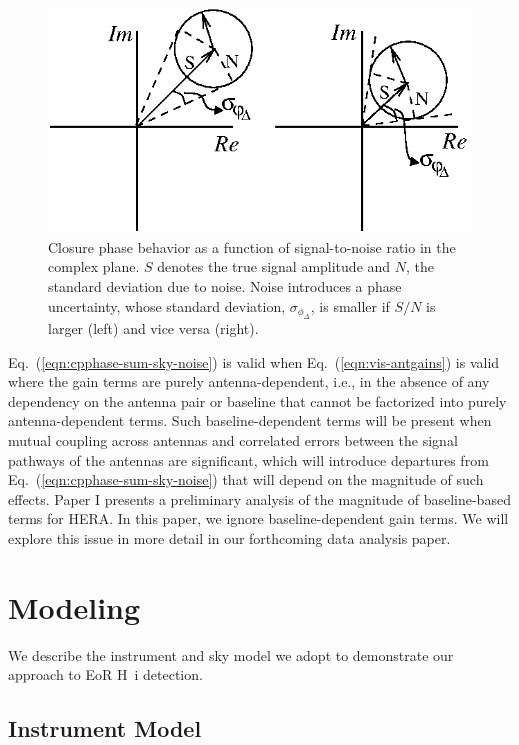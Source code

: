 \documentclass[
reprint,
superscriptaddress,
amsmath,
amssymb,
aps,
prd
]{revtex4-1}
\begin{document}
\begin{figure}[htb]
\includegraphics{phasor}
\caption{Closure phase behavior as a function of signal-to-noise ratio in the complex plane. $S$ denotes the true signal amplitude and $N$, the standard deviation due to noise. Noise introduces a phase uncertainty, whose standard deviation, $\sigma_{\phi_\Delta}$, is smaller if $S/N$ is larger (left) and vice versa (right). \label{fig:cpphase-cartoon}}
\end{figure}

Eq.~(\ref{eqn:cpphase-sum-sky-noise}) is valid when Eq.~(\ref{eqn:vis-antgains}) is valid where the gain terms are purely antenna-dependent, i.e., in the absence of any dependency on the antenna pair or baseline that cannot be factorized into purely antenna-dependent terms. Such baseline-dependent terms will be present when mutual coupling across antennas and correlated errors between the signal pathways of the antennas are significant, which will introduce departures from Eq.~(\ref{eqn:cpphase-sum-sky-noise}) that will depend on the magnitude of such effects. Paper I presents a preliminary analysis of the magnitude of baseline-based terms for HERA. In this paper, we ignore baseline-dependent gain terms. We will explore this issue in more detail in our forthcoming data analysis paper. 

\section{Modeling}\label{sec:modeling}

We describe the instrument and sky model we adopt to demonstrate our approach to EoR H~{\sc i} detection. 

\subsection{Instrument Model}\label{sec:instrument}
\end{document}
